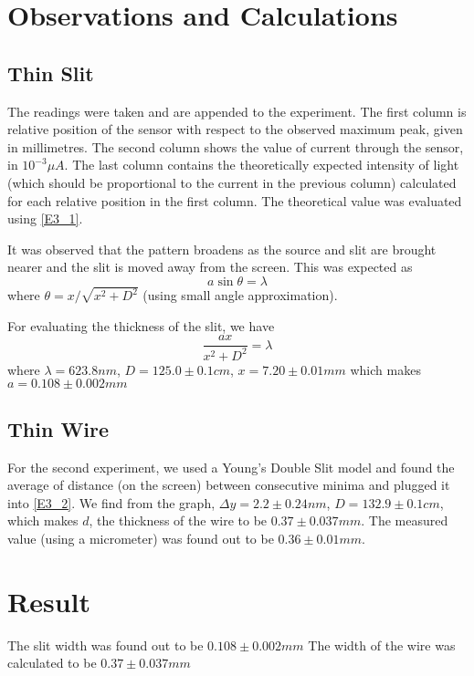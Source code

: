 \section{Observations and Calculations}	
	\subsection{Thin Slit}
	The readings were taken and are appended to the experiment. The first column is relative position of the sensor with respect to the observed maximum peak, given in millimetres. The second column shows the value of current through the sensor, in $10^{-3} \mu A$. The last column contains the theoretically expected intensity of light (which should be proportional to the current in the previous column) calculated for each relative position in the first column. The theoretical value was evaluated using \autoref{E3_1}.
	\par
	It was observed that the pattern broadens as the source and slit are brought nearer and the slit is moved away from the screen. This was expected as 
	\begin{equation}
		a \sin{\theta} = \lambda
	\end{equation}
	where $\theta = x/\sqrt{x^2 + D^2}$ (using small angle approximation).
	\par
	For evaluating the thickness of the slit, we have
	\begin{equation}
		\frac{ax}{x^2+D^2}=\lambda
	\end{equation}
	where $\lambda=623.8 nm$, $D = 125.0 \pm 0.1 cm$, $x=7.20 \pm 0.01 mm$ which makes $a=0.108 \pm 0.002 mm$

	\subsection{Thin Wire}
	For the second experiment, we used a Young's Double Slit model and found the average of distance (on the screen) between consecutive minima and plugged it into \autoref{E3_2}.
	We find from the graph, $\Delta y=2.2 \pm 0.24 nm$, $D=132.9 \pm 0.1 cm$, which makes $d$, the thickness of the wire to be $0.37 \pm 0.037 mm$. The measured value (using a micrometer) was found out to be $0.36\pm 0.01 mm$.

\section{Result}
	The slit width was found out to be $0.108 \pm 0.002 mm$
	The width of the wire was calculated to be $0.37 \pm 0.037 mm$

